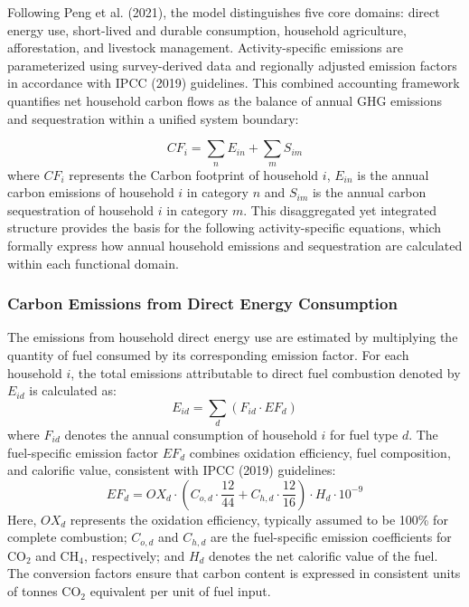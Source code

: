 \documentclass[12pt,a4paper]{article}%
\begin{document}
Following Peng et al. (2021), the model distinguishes five core domains: direct energy use, short-lived and durable consumption, household agriculture, afforestation, and livestock management. Activity-specific emissions are parameterized using survey-derived data and regionally adjusted emission factors in accordance with IPCC (2019) guidelines. This combined accounting framework quantifies net household carbon flows as the balance of annual GHG emissions and sequestration within a unified system boundary:

\begin{equation}
CF_i = \sum_{n} E_{in} + \sum_{m} S_{im}
\end{equation}
where $CF_i$ represents the Carbon footprint of household $i$, $E_{in}$ is the annual carbon emissions of household $i$ in category $n$ and $S_{im}$ is the annual carbon sequestration of household $i$ in category $m$. This disaggregated yet integrated structure provides the basis for the following activity-specific equations, which formally express how annual household emissions and sequestration are calculated within each functional domain.

\subsubsection{Carbon Emissions from Direct Energy Consumption}
The emissions from household direct energy use are estimated by multiplying the quantity of fuel consumed by its corresponding emission factor. For each household $i$, the total emissions attributable to direct fuel combustion denoted by $E_{id}$ is calculated as:
\begin{equation}
E_{id} = \sum_d (F_{id} \cdot EF_d)
\end{equation}
where $F_{id}$ denotes the annual consumption of household $i$  for fuel type $d$. The fuel-specific emission factor $EF_{d}$ combines oxidation efficiency, fuel composition, and calorific value, consistent with IPCC (2019) guidelines:
\begin{equation}
EF_d = OX_d \cdot \left(C_{o,d} \cdot \frac{12}{44} + C_{h,d} \cdot \frac{12}{16}\right) \cdot H_d \cdot 10^{-9}
\end{equation}
Here, $OX_d$ represents the oxidation efficiency, typically assumed to be 100\% for complete combustion; $C_{o,d}$ and $C_{h,d}$ are the fuel-specific emission coefficients for CO$_2$ and CH$_4$, respectively; and $H_d$ denotes the net calorific value of the fuel. The conversion factors ensure that carbon content is expressed in consistent units of tonnes CO$_2$ equivalent per unit of fuel input.
\end{document}
